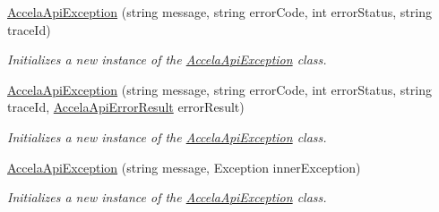 \begin{DoxyCompactItemize}
\hyperlink{class_accela_1_1_windows_store_s_d_k_1_1_accela_api_exception_a4163ddff39a00e2b87dff62772a4feeb}{Accela\+Api\+Exception} (string message, string error\+Code, int error\+Status, string trace\+Id)
\begin{DoxyCompactList}\small\item\em Initializes a new instance of the \hyperlink{class_accela_1_1_windows_store_s_d_k_1_1_accela_api_exception}{Accela\+Api\+Exception} class. \end{DoxyCompactList}\item 
\hyperlink{class_accela_1_1_windows_store_s_d_k_1_1_accela_api_exception_aa75b1f3539726ef698e3333dd6059e52}{Accela\+Api\+Exception} (string message, string error\+Code, int error\+Status, string trace\+Id, \hyperlink{class_accela_1_1_windows_store_s_d_k_1_1_accela_api_error_result}{Accela\+Api\+Error\+Result} error\+Result)
\begin{DoxyCompactList}\small\item\em Initializes a new instance of the \hyperlink{class_accela_1_1_windows_store_s_d_k_1_1_accela_api_exception}{Accela\+Api\+Exception} class. \end{DoxyCompactList}\item 
\hyperlink{class_accela_1_1_windows_store_s_d_k_1_1_accela_api_exception_ad0174ff051f8a45f1ce1e63cc6673365}{Accela\+Api\+Exception} (string message, Exception inner\+Exception)
\begin{DoxyCompactList}\small\item\em Initializes a new instance of the \hyperlink{class_accela_1_1_windows_store_s_d_k_1_1_accela_api_exception}{Accela\+Api\+Exception} class. \end{DoxyCompactList}\end{DoxyCompactItemize}
